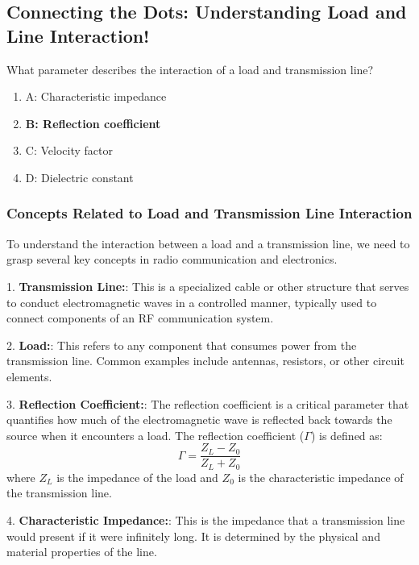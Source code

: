 \subsection{Connecting the Dots: Understanding Load and Line Interaction!}

\begin{tcolorbox}[colback=gray!10, colframe=black, title=E9E07] What parameter describes the interaction of a load and transmission line?
\begin{enumerate}[label=\Alph*)]
    \item A: Characteristic impedance
    \item \textbf{B: Reflection coefficient}
    \item C: Velocity factor
    \item D: Dielectric constant
\end{enumerate} \end{tcolorbox}

\subsubsection{Concepts Related to Load and Transmission Line Interaction}

To understand the interaction between a load and a transmission line, we need to grasp several key concepts in radio communication and electronics. 

1. \textbf{Transmission Line:}: This is a specialized cable or other structure that serves to conduct electromagnetic waves in a controlled manner, typically used to connect components of an RF communication system.

2. \textbf{Load:}: This refers to any component that consumes power from the transmission line. Common examples include antennas, resistors, or other circuit elements.

3. \textbf{Reflection Coefficient:}: The reflection coefficient is a critical parameter that quantifies how much of the electromagnetic wave is reflected back towards the source when it encounters a load. The reflection coefficient (\( \Gamma \)) is defined as:
   \[
   \Gamma = \frac{Z_L - Z_0}{Z_L + Z_0}
   \]
   where \( Z_L \) is the impedance of the load and \( Z_0 \) is the characteristic impedance of the transmission line. 

4. \textbf{Characteristic Impedance:}: This is the impedance that a transmission line would present if it were infinitely long. It is determined by the physical and material properties of the line.

